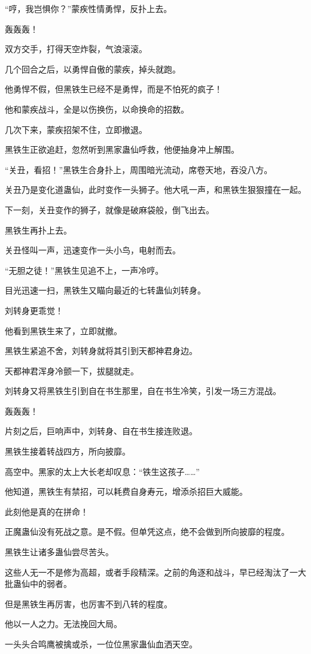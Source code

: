 \begin{this_body}
“哼，我岂惧你？”蒙疾性情勇悍，反扑上去。

轰轰轰！

双方交手，打得天空炸裂，气浪滚滚。

几个回合之后，以勇悍自傲的蒙疾，掉头就跑。

他勇悍不假，但黑铁生已经不是勇悍，而是不怕死的疯子！

他和蒙疾战斗，全是以伤换伤，以命换命的招数。

几次下来，蒙疾招架不住，立即撤退。

黑铁生正欲追赶，忽然听到黑家蛊仙呼救，他便抽身冲上解围。

“关丑，看招！”黑铁生合身扑上，周围暗光流动，席卷天地，吞没八方。

关丑乃是变化道蛊仙，此时变作一头狮子。他大吼一声，和黑铁生狠狠撞在一起。

下一刻，关丑变作的狮子，就像是破麻袋般，倒飞出去。

黑铁生再扑上去。

关丑怪叫一声，迅速变作一头小鸟，电射而去。

“无胆之徒！”黑铁生见追不上，一声冷哼。

目光迅速一扫，黑铁生又瞄向最近的七转蛊仙刘转身。

刘转身更乖觉！

他看到黑铁生来了，立即就撤。

黑铁生紧追不舍，刘转身就将其引到天都神君身边。

天都神君浑身冷颤一下，拔腿就走。

刘转身又将黑铁生引到自在书生那里，自在书生冷笑，引发一场三方混战。

轰轰轰！

片刻之后，巨响声中，刘转身、自在书生接连败退。

黑铁生接着转战四方，所向披靡。

高空中。黑家的太上大长老却叹息：“铁生这孩子……”

他知道，黑铁生有禁招，可以耗费自身寿元，增添杀招巨大威能。

此刻他是真的在拼命！

正魔蛊仙没有死战之意。是不假。但单凭这点，绝不会做到所向披靡的程度。

黑铁生让诸多蛊仙尝尽苦头。

这些人无一不是修为高超，或者手段精深。之前的角逐和战斗，早已经淘汰了一大批蛊仙中的弱者。

但是黑铁生再厉害，也厉害不到八转的程度。

他以一人之力。无法挽回大局。

一头头合鸣鹰被擒或杀，一位位黑家蛊仙血洒天空。


\end{this_body}
